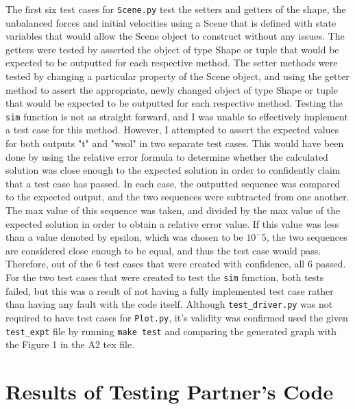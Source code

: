 \documentclass[12pt]{article}
\begin{document}
\newline
\newline
The first six test cases for \texttt{Scene.py} test the setters and getters of the shape, the unbalanced forces and initial velocities using a Scene that is defined with state variables that would allow the Scene object to construct without any issues. The getters were tested by asserted the object of type Shape or tuple that would be expected to be outputted for each respective method. The setter methods were tested by changing a particular property of the Scene object, and using the getter method to assert the appropriate, newly changed object of type Shape or tuple that would be expected to be outputted for each respective method. Testing the \texttt{sim} function is not as straight forward, and I was unable to effectively implement a test case for this method. However, I attempted to assert the expected values for both outputs "t" and "wsol" in two separate test cases. This would have been done by using the relative error formula to determine whether the calculated solution was close enough to the expected solution in order to confidently claim that a test case has passed. In each case, the outputted sequence was compared to the expected output, and the two sequences were subtracted from one another. The max value of this sequence was taken, and divided by the max value of the expected solution in order to obtain a relative error value. If this value was less than a value denoted by epsilon, which was chosen to be $10^-5$, the two sequences are considered close enough to be equal, and thus the test case would pass. Therefore, out of the 6 test cases that were created with confidence, all 6 passed. For the two test cases that were created to test the \texttt{sim} function, both tests failed, but this was a result of not having a fully implemented test case rather than having any fault with the code itself.
\newline
\newline
Although \texttt{test\_driver.py} was not required to have test cases for \texttt{Plot.py}, it's validity was confirmed used the given \texttt{test\_expt} file by running \texttt{make test} and comparing the generated graph with the Figure 1 in the A2 tex file.

\section{Results of Testing Partner's Code}
\end{document}
